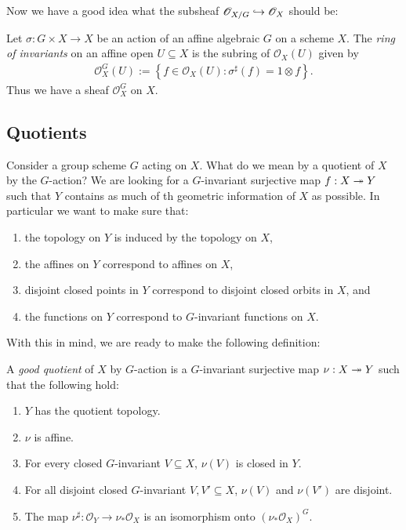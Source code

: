 \documentclass[12pt]{ociamthesis}  %
\begin{document}
Now we have a good idea what the subsheaf
$\mathscr O_{X/G}\hookrightarrow\mathscr O_X$ should be:
\begin{definition}
  Let $\sigma : G\times X \to X$ be an action of an affine algebraic
  $G$ on a scheme $X$. The \emph{ring of invariants}
  on an affine open $U\subseteq X$ is the subring of $\mathscr O_X(U)$
  given by
  \begin{align*}
    \mathscr O_X^G(U) :=
    \left\lbrace{f \in \mathscr O_X(U) : \sigma^\sharp(f) = 1 \otimes f}\right\rbrace.
  \end{align*}
  Thus we have a sheaf $\mathscr O_X^G$ on $X$.
\end{definition}

\begin{example}
  \missingexample
\end{example}

\subsection{Quotients}

Consider a group scheme $G$ acting on $X$. What do we mean by a
quotient of $X$ by the $G$-action? We are looking for a $G$-invariant
surjective map $f : X\twoheadrightarrow Y$ such that $Y$ contains as much of th
geometric information of $X$ as possible. In particular
we want to make sure that:
\begin{enumerate}
  \item the topology on $Y$ is induced by the topology on $X$,
  \item the affines on $Y$ correspond to affines on $X$,
  \item disjoint closed points in $Y$ correspond to disjoint
        closed orbits in $X$, and
  \item the functions on $Y$ correspond to $G$-invariant functions
        on $X$.
\end{enumerate}
With this in mind, we are ready to make the following definition:

\begin{definition}\label{def:good_quotient}
  A \emph{good quotient} of $X$ by $G$-action is a $G$-invariant
  surjective map $\nu : X\twoheadrightarrow Y$ such that the following hold:
  \begin{enumerate}
    \item $Y$ has the quotient topology.
    \item $\nu$ is affine.
    \item For every closed $G$-invariant $V\subseteq X$,
          $\nu(V)$ is closed in $Y$.
    \item For all disjoint closed $G$-invariant $V,V'\subseteq X$,
          $\nu(V)$ and $\nu(V')$ are disjoint.
    \item The map $\nu^\sharp : \mathscr O_Y \to \nu_*\mathscr O_X$
          is an isomorphism onto $(\nu_*\mathscr O_X)^G$.
  \end{enumerate}
\end{definition}
\end{document}
